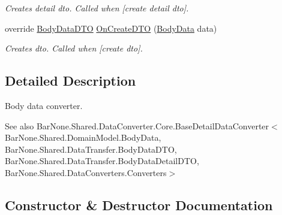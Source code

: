 \begin{DoxyCompactItemize}
\begin{DoxyCompactList}\small\item\em Creates detail dto. Called when \mbox{[}create detail dto\mbox{]}. \end{DoxyCompactList}\item 
override \mbox{\hyperlink{class_bar_none_1_1_shared_1_1_data_transfer_1_1_body_data_d_t_o}{Body\+Data\+D\+TO}} \mbox{\hyperlink{class_bar_none_1_1_shared_1_1_data_converters_1_1_body_data_converter_a56568d5bfc4ba97f1c0860bd2f4b0855}{On\+Create\+D\+TO}} (\mbox{\hyperlink{class_bar_none_1_1_shared_1_1_domain_model_1_1_body_data}{Body\+Data}} data)
\begin{DoxyCompactList}\small\item\em Creates dto. Called when \mbox{[}create dto\mbox{]}. \end{DoxyCompactList}\end{DoxyCompactItemize}


\subsection{Detailed Description}
Body data converter. 

\begin{DoxySeeAlso}{See also}
Bar\+None.\+Shared.\+Data\+Converter.\+Core.\+Base\+Detail\+Data\+Converter$<$\+Bar\+None.\+Shared.\+Domain\+Model.\+Body\+Data, Bar\+None.\+Shared.\+Data\+Transfer.\+Body\+Data\+D\+T\+O, Bar\+None.\+Shared.\+Data\+Transfer.\+Body\+Data\+Detail\+D\+T\+O, Bar\+None.\+Shared.\+Data\+Converters.\+Converters$>$


\end{DoxySeeAlso}


\subsection{Constructor \& Destructor Documentation}
\mbox{\label{class_bar_none_1_1_shared_1_1_data_converters_1_1_body_data_converter_ac16b3fc537fb704a88f91b52f06f7270}} 
